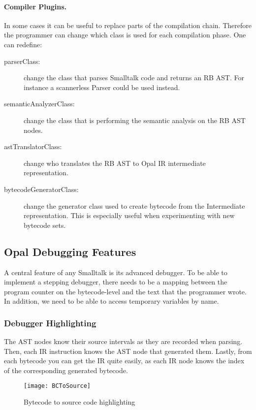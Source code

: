 \documentclass[preprint,10pt]{sigplanconf}
\begin{document}
\paragraph{Compiler Plugins.}

In some cases it can be useful to replace parts of the compilation chain. 
Therefore the programmer can change which class is used for each compilation phase.
One can redefine:

\begin{description}
\item[parserClass:] change the class that parses Smalltalk code and returns an RB AST. For instance a scannerless Parser could be used instead.
\item[semanticAnalyzerClass:] change the class that is performing the semantic analysis on the RB AST nodes.
\item[astTranslatorClass:] change who translates the RB AST to Opal IR intermediate representation.
\item[bytecodeGeneratorClass:] change the generator class used to create bytecode from the Intermediate representation. This is especially useful when experimenting with new bytecode sets.
\end{description}

\subsection{Opal Debugging Features}
\label{sec:opalDebugging}

A central feature of any Smalltalk is its advanced debugger. To be able to implement a stepping debugger, there needs to be a mapping between the program counter on the bytecode-level and the text that the programmer wrote.
In addition, we need to be able to access temporary variables by name.

\subsubsection{Debugger Highlighting}

The AST nodes know their source intervals as they are recorded when parsing. Then, each IR instruction knows the AST node that generated them. Lastly, from each bytecode you can get the IR quite easily, as each IR node knows the index of the corresponding generated bytecode.

\begin{figure}[ht]
\begin{center}
	\texttt{[image: BCToSource]}
	\caption{Bytecode to source code highlighting}
\end{center}
\end{figure}
\end{document}
